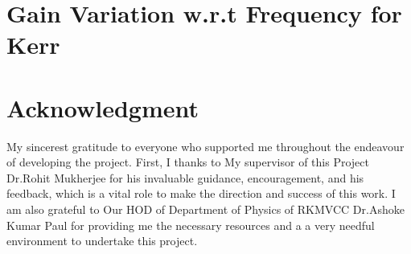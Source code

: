 \documentclass[12pt,a4paper]{article}
\begin{document}
\section{Gain Variation w.r.t Frequency for Kerr}

\newpage
\section*{Acknowledgment}
My sincerest gratitude to everyone who supported me throughout the endeavour of developing the project. First, I thanks to My supervisor of this Project Dr.Rohit Mukherjee for his invaluable guidance, encouragement, and his feedback, which is a vital role to make the direction and success of this work. I am also grateful to Our HOD of Department of Physics of RKMVCC Dr.Ashoke Kumar Paul for providing me the necessary resources and a a very needful environment to undertake this project.

\newpage


\end{document}
